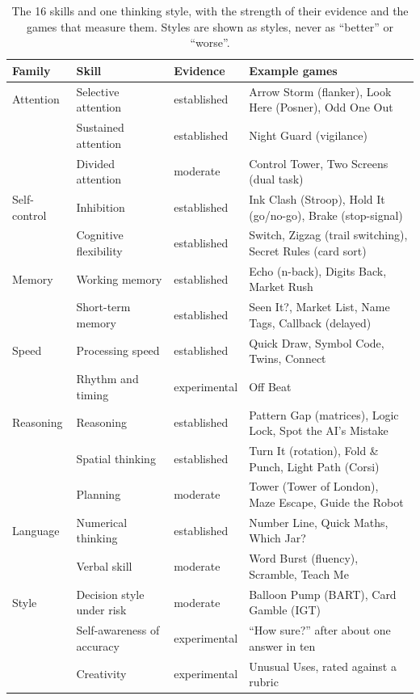 \documentclass[10pt,a4paper]{article}
\begin{document}
\begin{table}[h]
\centering\small
\begin{tabular}{@{}llll@{}}
\toprule
Family & Skill & Evidence & Example games \\
\midrule
Attention & Selective attention & established & Arrow Storm (flanker), Look Here (Posner), Odd One Out \\
 & Sustained attention & established & Night Guard (vigilance) \\
 & Divided attention & moderate & Control Tower, Two Screens (dual task) \\
Self-control & Inhibition & established & Ink Clash (Stroop), Hold It (go/no-go), Brake (stop-signal) \\
 & Cognitive flexibility & established & Switch, Zigzag (trail switching), Secret Rules (card sort) \\
Memory & Working memory & established & Echo (n-back), Digits Back, Market Rush \\
 & Short-term memory & established & Seen It?, Market List, Name Tags, Callback (delayed) \\
Speed & Processing speed & established & Quick Draw, Symbol Code, Twins, Connect \\
 & Rhythm and timing & experimental & Off Beat \\
Reasoning & Reasoning & established & Pattern Gap (matrices), Logic Lock, Spot the AI's Mistake \\
 & Spatial thinking & established & Turn It (rotation), Fold \& Punch, Light Path (Corsi) \\
 & Planning & moderate & Tower (Tower of London), Maze Escape, Guide the Robot \\
Language & Numerical thinking & established & Number Line, Quick Maths, Which Jar? \\
 & Verbal skill & moderate & Word Burst (fluency), Scramble, Teach Me \\
Style & Decision style under risk & moderate & Balloon Pump (BART), Card Gamble (IGT) \\
 & Self-awareness of accuracy & experimental & ``How sure?'' after about one answer in ten \\
 & Creativity & experimental & Unusual Uses, rated against a rubric \\
\bottomrule
\end{tabular}
\caption{The 16 skills and one thinking style, with the strength of their evidence and the games that
measure them. Styles are shown as styles, never as ``better'' or ``worse''.}
\end{table}
\end{document}
